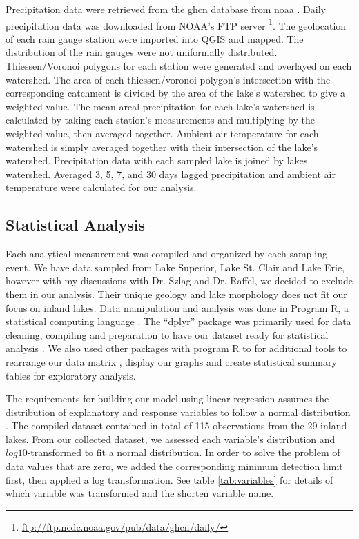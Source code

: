 Precipitation data were retrieved from the \gls{ghcn} database from \gls{noaa} \cite{menne_global_2012}. Daily precipitation data was downloaded from NOAA's FTP server \footnote{\url{ftp://ftp.ncdc.noaa.gov/pub/data/ghcn/daily/}}.  The geolocation of each rain gauge station were imported into QGIS and mapped. The distribution of the rain gauges were not uniformally distributed. Thiessen/Voronoi polygons for each station were generated and overlayed on each watershed. The area of each thiessen/voronoi polygon's intersection with the corresponding catchment is divided by the area of the lake's watershed to give a weighted value. The mean areal precipitation for each lake's watershed is calculated by taking each station's measurements and multiplying by the weighted value, then averaged together.  Ambient air temperature for each watershed is simply averaged together with their intersection of the lake's watershed. Precipitation data with each sampled lake is joined by lakes watershed. Averaged 3, 5, 7, and 30 days lagged precipitation and ambient air temperature were calculated for our analysis.

\subsection{Statistical Analysis}

Each analytical measurement was compiled and organized by each sampling event. We have data sampled from Lake Superior, Lake St. Clair and Lake Erie, however with my discussions with Dr. Szlag and Dr. Raffel, we decided to exclude them in our analysis.  Their unique geology and lake morphology does not fit our focus on inland lakes.
Data manipulation and analysis was done in Program R, a statistical computing language \cite{r_core_team_r:_2018}. The ``dplyr'' package was primarily used for data cleaning, compiling and preparation to have our dataset ready for statistical analysis \cite{wickham_dplyr:_2017}. We also used other packages with program R to for additional tools to rearrange our data matrix \cite{robinson_broom:_2018}, display our graphs\cite{wickham_ggplot2:_2009,schloerke_ggally:_2017, garnier_viridis:_2018, wei_r_2017} and create statistical summary tables \cite{leifeld_texreg:_2013,  wickham_tidyverse:_2017, zhu_kableextra:_2018, hlavac_stargazer:_2018, robinson_broom:_2018} for exploratory analysis.

The requirements for building our model using linear regression assumes the distribution of explanatory and response variables to follow a normal distribution \cite{bates_fitting_2015}. The compiled dataset contained in total of 115 observations from the 29 inland lakes.
From our collected dataset, we assessed each variable's distribution and $log10$-transformed to fit a normal distribution. In order to solve the problem of data values that are zero, we added the corresponding minimum detection limit first, then applied a log transformation. See table \ref{tab:variables} for details of which variable was transformed and the shorten variable name.


